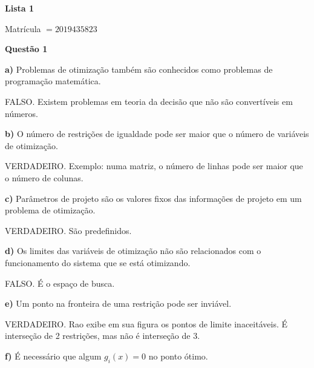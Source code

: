 \documentclass{rbfin}
\begin{document}
\rbfe{}


\begin{center}
\Large

\textbf{Lista 1}

\normalsize

Matrícula $= 2019435823$
\end{center}

\large

\textbf{Questão 1}

\normalsize

\vspace{6mm}

\textbf{a)} Problemas de otimização também são conhecidos como problemas de programação matemática.

FALSO. Existem problemas em teoria da decisão que não são convertíveis em números.

\vspace{3mm}

\textbf{b)} O número de restrições de igualdade pode ser maior que o número de variáveis de otimização.

VERDADEIRO. Exemplo: numa matriz, o número de linhas pode ser maior que o número de colunas.

\vspace{3mm}

\textbf{c)} Parâmetros de projeto são os valores fixos das informações de projeto em um problema de otimização.

VERDADEIRO. São predefinidos.

\vspace{3mm}

\textbf{d)} Os limites das variáveis de otimização não são relacionados com o funcionamento do sistema que se está otimizando.

FALSO. É o espaço de busca.

\vspace{3mm}

\textbf{e)} Um ponto na fronteira de uma restrição pode ser inviável.

VERDADEIRO. Rao exibe em sua figura os pontos de limite inaceitáveis. É interseção de 2 restrições, mas não é interseção de 3.

\vspace{3mm}

\textbf{f)} É necessário que algum $g_i(x) = 0$ no ponto ótimo.
\end{document}
